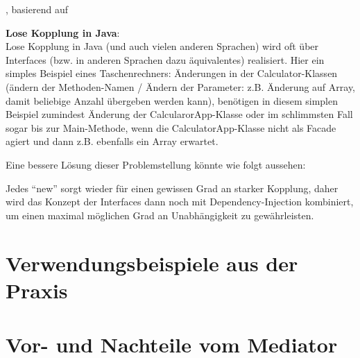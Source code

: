 \medskip
\noindent\autocite[vgl.][]{loosecoupling_reconceptualization}, basierend auf \autocite[vgl.][S. 101ff]{meilir_loosecoupling}
\medskip

\textbf{Lose Kopplung in Java}: \\
Lose Kopplung in Java (und auch vielen anderen Sprachen) wird oft über Interfaces (bzw. in anderen Sprachen dazu äquivalentes) realisiert. Hier ein simples Beispiel eines Taschenrechners:
Änderungen in der Calculator-Klassen (ändern der Methoden-Namen / Ändern der Parameter: z.B. Änderung auf Array, damit beliebige Anzahl übergeben werden kann), benötigen in diesem simplen Beispiel zumindest Änderung der CalcularorApp-Klasse oder im schlimmsten Fall sogar bis zur Main-Methode, wenn die CalculatorApp-Klasse nicht als Facade agiert und dann z.B. ebenfalls ein Array erwartet.

Eine bessere Lösung dieser Problemstellung könnte wie folgt aussehen:

Jedes \enquote{new} sorgt wieder für einen gewissen Grad an starker Kopplung, daher wird das Konzept der Interfaces dann noch mit Dependency-Injection kombiniert, um einen maximal möglichen Grad an Unabhängigkeit zu gewährleisten.
% 
\section{Verwendungsbeispiele aus der Praxis}
% 
\filbreak
\section{Vor- und Nachteile vom Mediator}\label{ref:vorteileNachteile}
